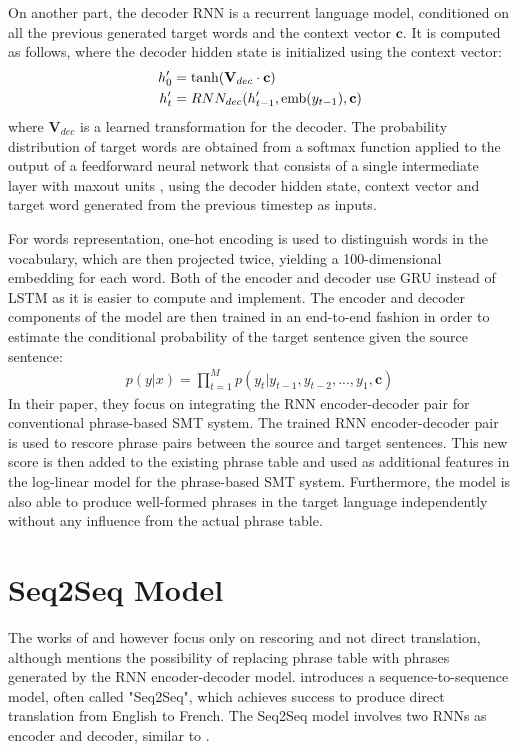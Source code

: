 \documentclass[12pt]{extarticle}
\begin{document}
On another part, the decoder RNN is a recurrent language model, conditioned on all the previous generated target words and the context vector $\textbf{c}$. It is computed as follows, where the decoder hidden state is initialized using the context vector:
\begin{align} 
h'_{0} &= \textnormal{tanh}(\textbf{V}_{dec} \cdot \textbf{c}) \\
h'_{t} &= RNN_{dec}(h'_{t-1}, \textnormal{emb}(y_{t-1}), \textbf{c}) 
\label{eq:18}
\end{align}
where $\textbf{V}_{dec}$ is a learned transformation for the decoder. The probability distribution of target words are obtained from a softmax function applied to the output of a feedforward neural network that consists of a single intermediate layer with maxout units \citep{Goodfellow:2013:MN:3042817.3043084}, using the decoder hidden state, context vector and target word generated from the previous timestep as inputs.

For words representation, one-hot encoding is used to distinguish words in the vocabulary, which are then projected twice, yielding a 100-dimensional embedding for each word.
Both of the encoder and decoder use GRU instead of LSTM as it is easier to compute and implement. The encoder and decoder components of the model are then trained in an end-to-end fashion in order to estimate the conditional probability of the target sentence given the source sentence: 
\begin{align}
p(y|x) = \prod_{t=1}^{M} p(y_{t} | y_{t-1}, y_{t-2},...,y_{1}, \textbf{c}) \label{eq:19}
\end{align}
In their paper, they focus on integrating the RNN encoder-decoder pair for conventional phrase-based SMT system. The trained RNN encoder-decoder pair is used to rescore phrase pairs between the source and target sentences. This new score is then added to the existing phrase table and used as additional features in the log-linear model for the phrase-based SMT system. Furthermore, the model is also able to produce well-formed phrases in the target language independently without any influence from the actual phrase table.


\section*{Seq2Seq Model}
The works of \citep{kalchbrenner-blunsom-2013-recurrent-continuous} and \citep{cho-etal-2014-learning} however focus only on rescoring and not direct translation, although \citep{cho-etal-2014-learning} mentions the possibility of replacing phrase table with phrases generated by the RNN encoder-decoder model. \citep{Sutskever:2014:SSL:2969033.2969173} introduces a sequence-to-sequence model, often called "Seq2Seq", which achieves success to produce direct translation from English to French. The Seq2Seq model involves two RNNs as encoder and decoder, similar to \citep{cho-etal-2014-learning}.
\end{document}
